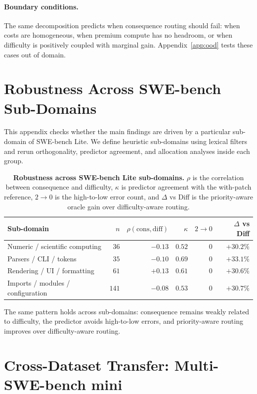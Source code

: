 \documentclass{article}
\begin{document}
\paragraph{Boundary conditions.}
The same decomposition predicts when consequence routing should fail:
when costs are homogeneous, when premium compute has no headroom, or
when difficulty is positively coupled with marginal gain.
Appendix~\ref{app:ood} tests these cases out of domain.

\section{Robustness Across SWE-bench Sub-Domains}
\label{app:subdomain}

This appendix checks whether the main findings are driven by a
particular sub-domain of SWE-bench Lite. We define heuristic
sub-domains using lexical filters and rerun orthogonality, predictor
agreement, and allocation analyses inside each group.

\begin{table}[h]
\centering
\caption{\textbf{Robustness across SWE-bench Lite sub-domains.}
$\rho$ is the correlation between consequence and difficulty,
$\kappa$ is predictor agreement with the with-patch reference,
$2\to0$ is the high-to-low error count, and $\Delta$ vs Diff is the
priority-aware oracle gain over difficulty-aware routing.}
\label{tab:subdomain}
\small
\begin{tabular}{lrrrrr}
\toprule
Sub-domain & $n$ & $\rho(\mathrm{cons},\mathrm{diff})$ & $\kappa$ & $2\to0$ & $\Delta$ vs Diff \\
\midrule
Numeric / scientific computing    & $36$  & $-0.13$ & $0.52$ & $0$ & $+30.2\%$ \\
Parsers / CLI / tokens            & $35$  & $-0.10$ & $0.69$ & $0$ & $+33.1\%$ \\
Rendering / UI / formatting       & $61$  & $+0.13$ & $0.61$ & $0$ & $+30.6\%$ \\
Imports / modules / configuration & $141$ & $-0.08$ & $0.53$ & $0$ & $+30.7\%$ \\
\bottomrule
\end{tabular}
\end{table}

The same pattern holds across sub-domains: consequence remains weakly
related to difficulty, the predictor avoids high-to-low errors, and
priority-aware routing improves over difficulty-aware routing.

\section{Cross-Dataset Transfer: Multi-SWE-bench mini}
\label{app:crossdataset}
\end{document}
